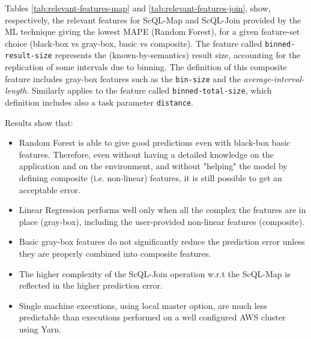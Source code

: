 \documentclass[a4paper, 10pt, conference]{ieeeconf}      %
\begin{document}



Tables \ref{tab:relevant-features-map} and  \ref{tab:relevant-features-join}, show, respectively, the relevant features for ScQL-Map and ScQL-Join provided by the ML technique giving the lowest MAPE (Random Forest), for a given feature-set choice (black-box vs gray-box, basic vs composite).
The feature called \texttt{binned-result-size} represents the (known-by-semantics) result size, accounting for the replication of some intervals due to binning. The definition of this composite feature includes gray-box features such as the \texttt{bin-size} and the \textit{average-interval-length}.
Similarly applies to the feature called \texttt{binned-total-size}, which definition includes also a task parameter \texttt{distance}.

\noindent Results show that:
\begin{itemize}
    \item Random Forest is able to give good predictions even with black-box basic features. Therefore,  even without having a detailed knowledge on the application and on the environment, and without "helping" the model by defining composite (i.e. non-linear) features, it is still possible to get an acceptable error. 
    \item Linear Regression performs well only when all the complex the features are in place (gray-box), including the user-provided non-linear features (composite). 
    \item Basic gray-box features do not significantly reduce the prediction error unless they are properly combined into composite features. 
    \item The higher complexity of the ScQL-Join operation w.r.t the ScQL-Map is reflected in the higher prediction error.
    \item Single machine executions, using local master option, are much less predictable than executions performed on a well configured AWS cluster using Yarn.
    \color{blue}
    \color{black}
\end{itemize}
\end{document}
